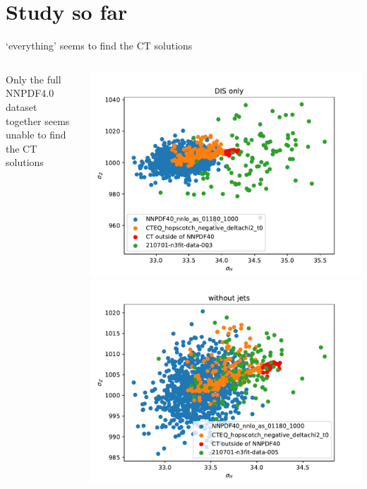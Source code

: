 \documentclass[aspectratio=169,10pt]{beamer}
\begin{document}
\section{Study so far}

\begin{frame}[t]{`everything' seems to find the CT solutions}
  \vspace*{-1.5em}
  \begin{columns}
    \begin{column}{.28\textwidth}
      Only the full NNPDF4.0 dataset together seems unable to find the CT solutions
    \end{column}
    \begin{column}{.7\textwidth}
      \centering
      \includegraphics[height=.45\textheight]{DIS_only.pdf}
      \includegraphics[height=.45\textheight]{without_jets.pdf}\\

\end{column}
\end{columns}
\end{frame}
\end{document}
